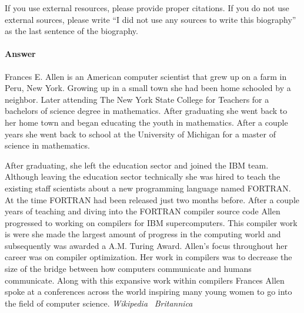 \documentclass{article}
\begin{document}
If you use external resources, please provide
proper citations. If you do not use external sources, please write ``I did not
use any sources to write this biography'' as the last sentence of the
biography.

\paragraph{Answer}
Frances E. Allen is an American computer scientist that grew up on a farm in Peru,
New York. Growing up in a small town she had been home schooled by a neighbor.
Later attending The New York State College for Teachers for a bachelors of science
degree in mathematics. After graduating she went back to her home town and began
educating the youth in mathematics. After a couple years she went back to school
at the University of Michigan for a master of science in mathematics.

After graduating, she left the education sector and joined the IBM team. Although
leaving the education sector technically she was hired to teach the existing
staff scientists about a new programming language named FORTRAN. At the time FORTRAN
had been released just two months before. After a couple years of teaching and
diving into the FORTRAN compiler source code Allen progressed to working on
compilers for IBM supercomputers. This compiler work is were she made the
largest amount of progress in the computing world and subsequently was awarded
a A.M. Turing Award. Allen's focus throughout her career was on compiler optimization.
Her work in compilers was to decrease the size of the bridge between how computers
communicate and humans communicate. Along with this expansive work within compilers
Frances Allen spoke at a conferences across the world inspiring many young women
to go into the field of computer science.
\emph{Wikipedia}~\cite{wikipedia}
\emph{Britannica}~\cite{britannica}

 \newpage
 
 
\end{document}
